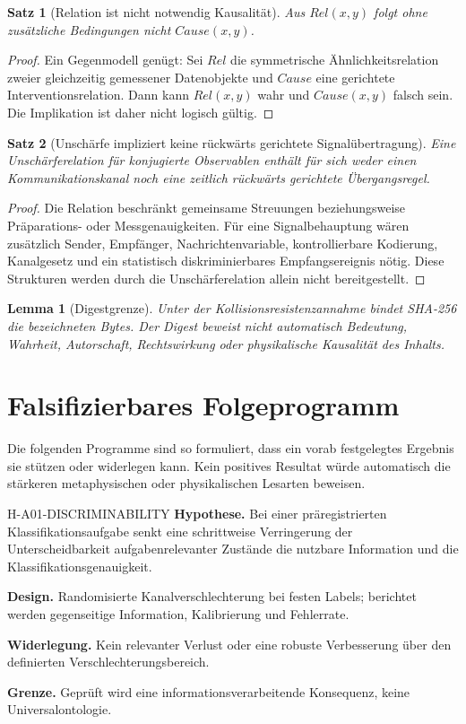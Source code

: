 \documentclass[11pt,a4paper]{article}
\newtheorem{satz}{Satz}
\newtheorem{lemma}{Lemma}
\begin{document}
\begin{satz}[Relation ist nicht notwendig Kausalität]
Aus $Rel(x,y)$ folgt ohne zusätzliche Bedingungen nicht $Cause(x,y)$.
\end{satz}
\begin{proof}
Ein Gegenmodell genügt: Sei $Rel$ die symmetrische Ähnlichkeitsrelation zweier gleichzeitig gemessener Datenobjekte und $Cause$ eine gerichtete Interventionsrelation. Dann kann $Rel(x,y)$ wahr und $Cause(x,y)$ falsch sein. Die Implikation ist daher nicht logisch gültig.
\end{proof}

\begin{satz}[Unschärfe impliziert keine rückwärts gerichtete Signalübertragung]
Eine Unschärferelation für konjugierte Observablen enthält für sich weder einen Kommunikationskanal noch eine zeitlich rückwärts gerichtete Übergangsregel.
\end{satz}
\begin{proof}
Die Relation beschränkt gemeinsame Streuungen beziehungsweise Präparations- oder Messgenauigkeiten. Für eine Signalbehauptung wären zusätzlich Sender, Empfänger, Nachrichtenvariable, kontrollierbare Kodierung, Kanalgesetz und ein statistisch diskriminierbares Empfangsereignis nötig. Diese Strukturen werden durch die Unschärferelation allein nicht bereitgestellt.
\end{proof}

\begin{lemma}[Digestgrenze]
Unter der Kollisionsresistenzannahme bindet SHA-256 die bezeichneten Bytes. Der Digest beweist nicht automatisch Bedeutung, Wahrheit, Autorschaft, Rechtswirkung oder physikalische Kausalität des Inhalts.
\end{lemma}

\section{Falsifizierbares Folgeprogramm}
Die folgenden Programme sind so formuliert, dass ein vorab festgelegtes Ergebnis sie stützen oder widerlegen kann. Kein positives Resultat würde automatisch die stärkeren metaphysischen oder physikalischen Lesarten beweisen.

\begin{boundarybox}{H-A01-DISCRIMINABILITY}
\textbf{Hypothese.} Bei einer präregistrierten Klassifikationsaufgabe senkt eine schrittweise Verringerung der Unterscheidbarkeit aufgabenrelevanter Zustände die nutzbare Information und die Klassifikationsgenauigkeit.\par
\textbf{Design.} Randomisierte Kanalverschlechterung bei festen Labels; berichtet werden gegenseitige Information, Kalibrierung und Fehlerrate.\par
\textbf{Widerlegung.} Kein relevanter Verlust oder eine robuste Verbesserung über den definierten Verschlechterungsbereich.\par
\textbf{Grenze.} Geprüft wird eine informationsverarbeitende Konsequenz, keine Universalontologie.
\end{boundarybox}
\end{document}
